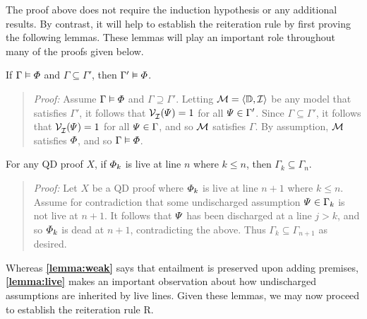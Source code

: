 The proof above does not require the induction hypothesis or any additional results.
By contrast, it will help to establish the reiteration rule by first proving the following lemmas.
These lemmas will play an important role throughout many of the proofs given below.

\begin{Lthm} \label{lemma:weak}
  If $\Gamma \vDash \varPhi$ and $\Gamma \subseteq \Gamma'$, then $\Gamma' \vDash \varPhi$.
\end{Lthm}

\begin{quote} 
  \textit{Proof:} Assume $\Gamma \vDash \varPhi$ and $\Gamma \supseteq \Gamma'$.
  Letting $\mathcal{M}=\langle\mathbb{D},\mathcal{I}\rangle$ be any model that satisfies $\Gamma'$, it follows that $\mathcal{V}_{\mathcal{I}}^{}(\varPsi)=1$ for all $\varPsi \in \Gamma'$.
  Since $\Gamma\subseteq \Gamma'$, it follows that $\mathcal{V}_{\mathcal{I}}^{}(\varPsi)=1$ for all $\varPsi \in \Gamma$, and so $\mathcal{M}$ satisfies $\Gamma$. 
  By assumption, $\mathcal{M}$ satisfies $\varPhi$, and so $\Gamma \vDash \varPhi$.
\end{quote}



\begin{Lthm} \label{lemma:live}
  For any QD proof $X$, if $\varPhi_k$ is live at line $n$ where $k\leq n$, then $\Gamma_k\subseteq \Gamma_{n}$.
\end{Lthm}

\begin{quote} 
  \textit{Proof:} Let $X$ be a QD proof where $\varPhi_k$ is live at line $n+1$ where $k\leq n$.
  Assume for contradiction that some undischarged assumption $\varPsi \in \Gamma_k$ is not live at $n+1$.
  It follows that $\varPsi$ has been discharged at a line $j>k$, and so $\varPhi_k$ is dead at $n+1$, contradicting the above.
  Thus $\Gamma_k\subseteq \Gamma_{n+1}$ as desired.
\end{quote}

Whereas \textbf{\ref{lemma:weak}} says that entailment is preserved upon adding premises, \textbf{\ref{lemma:live}} makes an important observation about how undischarged assumptions are inherited by live lines.
Given these lemmas, we may now proceed to establish the reiteration rule R.


